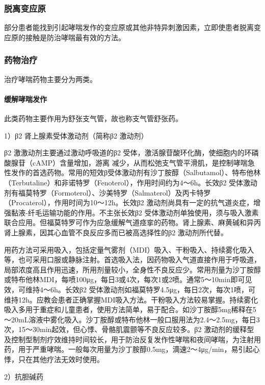 \subsubsection{脱离变应原}

部分患者能找到引起哮喘发作的变应原或其他非特异刺激因素，立即使患者脱离变应原的接触是防治哮喘最有效的方法。

\subsubsection{药物治疗}

治疗哮喘药物主要分为两类。
\paragraph{缓解哮喘发作}

此类药物主要作用为舒张支气管，故也称支气管舒张药。

1）β{2} 肾上腺素受体激动剂（简称β{2} 激动剂）

β{2} 激激动剂主要通过激动呼吸道的β{2}
受体，激活腺苷酸环化酶，使细胞内的环磷酸腺苷（cAMP）含量增加，游离
减少，从而松弛支气管平滑肌，是控制哮喘急性发作的首选药物。常用的短效β受体激动剂有沙丁胺醇（Salbutamol）、特布他林（Terbutaline）和非诺特罗（Fenoterol），作用时间约为4～6h。长效β{2}
受体激动剂有福莫特罗（Formoterol）、沙美特罗（Salmaterol）及丙卡特罗（Procaterol），作用时间为10～12h。长效β{2}
激动剂尚具有一定的抗气道炎症，增强黏液-纤毛运输功能的作用。不主张长效β{2}
受体激动剂单独使用，须与吸入激素联合应用。但福莫特罗可作为应急缓解气道痉挛的药物。肾上腺素、麻黄碱和异丙肾上腺素，因其心血管不良反应多而已被高选择性的β{2}
激动剂所代替。

用药方法可采用吸入，包括定量气雾剂（MDI）吸入、干粉吸入、持续雾化吸入等，也可采用口服或静脉注射。首选吸入法，因药物吸入气道直接作用于呼吸道，局部浓度高且作用迅速，所用剂量较小，全身性不良反应少。常用剂量为沙丁胺醇或特布他林MDI，每喷100μg，每日3或4次，每次1或2喷。通常5～10min即可见效，可维持4～6h。长效β{2}
受体激动剂如福莫特罗4.5μg，每日2次，每次1喷，可维持12h。应教会患者正确掌握MDI吸入方法。干粉吸入方法较易掌握。持续雾化吸入多用于重症和儿童患者，使用方法简单，易于配合。如沙丁胺醇5mg稀释在5～20mL溶液中雾化吸入。沙丁胺醇或特布他林一般口服用法为2.4～2.5mg，每日3次，15～30min起效，但心悸、骨骼肌震颤等不良反应较多。β{2}
激动剂的缓释型及控制型制剂疗效维持时间较长，用于防治反复发作性哮喘和夜间哮喘，为注射用药，用于严重哮喘。一般每次用量为沙丁胺醇0.5mg，滴速2～4μg/min，易引起心悸，只在其他疗法无效时使用。

2）抗胆碱药

